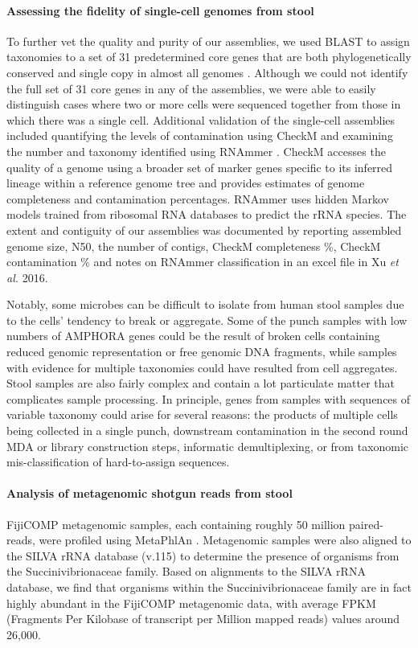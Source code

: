 \paragraph{Assessing the fidelity of single-cell genomes from stool}
To further vet the quality and purity of our assemblies, we used BLAST to assign taxonomies to a set of 31 predetermined core genes that are both phylogenetically conserved and single copy in almost all genomes \cite{Wu:2012dh}. Although we could not identify the full set of 31 core genes in any of the assemblies, we were able to easily distinguish cases where two or more cells were sequenced together from those in which there was a single cell. Additional validation of the single-cell assemblies included quantifying the levels of contamination using CheckM \cite{Parks:2015hs} and examining the number and taxonomy identified using RNAmmer \cite{Lagesen:2007ud}. CheckM accesses the quality of a genome using a broader set of marker genes specific to its inferred lineage within a reference genome tree and provides estimates of genome completeness and contamination percentages. RNAmmer uses hidden Markov models trained from ribosomal RNA databases to predict the rRNA species. The extent and contiguity of our assemblies was documented by reporting assembled genome size, N50, the number of contigs, CheckM completeness \%, CheckM contamination \% and notes on RNAmmer classification in an excel file in Xu \textit{et al.} 2016.

Notably, some microbes can be difficult to isolate from human stool samples due to the cells' tendency to break or aggregate. Some of the punch samples with low numbers of AMPHORA genes could be the result of broken cells containing reduced genomic representation or free genomic DNA fragments, while samples with evidence for multiple taxonomies could have resulted from cell aggregates. Stool samples are also fairly complex and contain a lot particulate matter that complicates sample processing. In principle, genes from samples with sequences of variable taxonomy could arise for several reasons: the products of multiple cells being collected in a single punch, downstream contamination in the second round MDA or library construction steps, informatic demultiplexing, or from taxonomic mis-classification of hard-to-assign sequences.

\paragraph{Analysis of metagenomic shotgun reads from stool}
FijiCOMP metagenomic samples, each containing roughly 50 million paired-reads, were profiled using MetaPhlAn \cite{Segata:2012ts}. Metagenomic samples were also aligned to the SILVA rRNA database (v.115) to determine the presence of organisms from the Succinivibrionaceae family. Based on alignments to the SILVA rRNA database, we find that organisms within the Succinivibrionaceae family are in fact highly abundant in the FijiCOMP metagenomic data, with average FPKM (Fragments Per Kilobase of transcript per Million mapped reads) values around 26,000.

